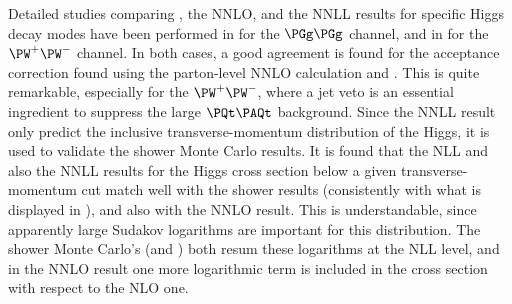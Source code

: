Detailed studies comparing \MCatNLO, the NNLO, and the NNLL results
for specific Higgs decay modes have been performed in
for the $\PGg\PGg$ channel, and in 
 for the $\PW^+\PW^-$ channel.
In both cases, a good agreement is found for the acceptance correction
found using the parton-level NNLO calculation and \MCatNLO.
This is quite remarkable, especially for the $\PW^+\PW^-$, where a jet veto
is an essential ingredient to suppress the large $\PQt\PAQt$ background.
Since the NNLL result only predict the inclusive transverse-momentum
distribution of the Higgs, it is used to validate the shower Monte Carlo
results. It is found that the NLL and also the NNLL results for the Higgs
cross section below a given transverse-momentum cut match
well with the shower results (consistently with what is displayed in
), and also with the NNLO result. This is understandable,
since apparently large Sudakov logarithms are important for this distribution.
The shower Monte Carlo's (\MCatNLO and \herwig) both resum these logarithms
at the NLL level, and in the NNLO result one more logarithmic term is
included in the cross section with respect to the NLO one.


